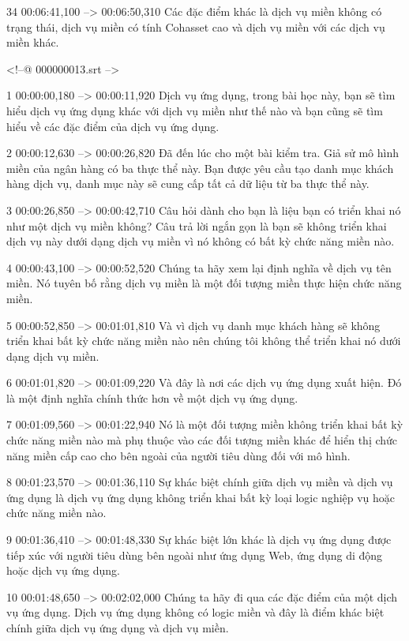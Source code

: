 34
00:06:41,100 --> 00:06:50,310
Các đặc điểm khác là dịch vụ miền không có trạng thái, dịch vụ miền có tính Cohasset cao và dịch vụ miền với các dịch vụ miền khác.

<!--@ 000000013.srt -->

1
00:00:00,180 --> 00:00:11,920
Dịch vụ ứng dụng, trong bài học này, bạn sẽ tìm hiểu dịch vụ ứng dụng khác với dịch vụ miền như thế nào và bạn cũng sẽ tìm hiểu về các đặc điểm của dịch vụ ứng dụng.

2
00:00:12,630 --> 00:00:26,820
Đã đến lúc cho một bài kiểm tra.  Giả sử mô hình miền của ngân hàng có ba thực thể này.  Bạn được yêu cầu tạo danh mục khách hàng dịch vụ, danh mục này sẽ cung cấp tất cả dữ liệu từ ba thực thể này.

3
00:00:26,850 --> 00:00:42,710
Câu hỏi dành cho bạn là liệu bạn có triển khai nó như một dịch vụ miền không?  Câu trả lời ngắn gọn là bạn sẽ không triển khai dịch vụ này dưới dạng dịch vụ miền vì nó không có bất kỳ chức năng miền nào.

4
00:00:43,100 --> 00:00:52,520
Chúng ta hãy xem lại định nghĩa về dịch vụ tên miền.  Nó tuyên bố rằng dịch vụ miền là một đối tượng miền thực hiện chức năng miền.

5
00:00:52,850 --> 00:01:01,810
Và vì dịch vụ danh mục khách hàng sẽ không triển khai bất kỳ chức năng miền nào nên chúng tôi không thể triển khai nó dưới dạng dịch vụ miền.

6
00:01:01,820 --> 00:01:09,220
Và đây là nơi các dịch vụ ứng dụng xuất hiện.  Đó là một định nghĩa chính thức hơn về một dịch vụ ứng dụng.

7
00:01:09,560 --> 00:01:22,940
Nó là một đối tượng miền không triển khai bất kỳ chức năng miền nào mà phụ thuộc vào các đối tượng miền khác để hiển thị chức năng miền cấp cao cho bên ngoài của người tiêu dùng đối với mô hình.

8
00:01:23,570 --> 00:01:36,110
Sự khác biệt chính giữa dịch vụ miền và dịch vụ ứng dụng là dịch vụ ứng dụng không triển khai bất kỳ loại logic nghiệp vụ hoặc chức năng miền nào.

9
00:01:36,410 --> 00:01:48,330
Sự khác biệt lớn khác là dịch vụ ứng dụng được tiếp xúc với người tiêu dùng bên ngoài như ứng dụng Web, ứng dụng di động hoặc dịch vụ ứng dụng.

10
00:01:48,650 --> 00:02:02,000
Chúng ta hãy đi qua các đặc điểm của một dịch vụ ứng dụng.  Dịch vụ ứng dụng không có logic miền và đây là điểm khác biệt chính giữa dịch vụ ứng dụng và dịch vụ miền.


